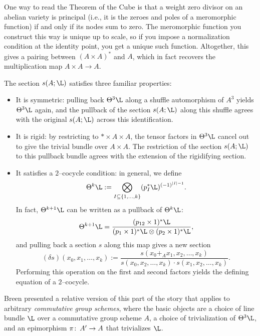 \begin{remark}
One way to read the Theorem of the Cube is that a weight zero divisor on an abelian variety is principal (i.e., it is the zeroes and poles of a meromorphic function) if and only if its nodes sum to zero.  The meromorphic function you construct this way is unique up to scale, so if you impose a normalization condition at the identity point, you get a unique such function.  Altogether, this gives a pairing between \((A \times A)^*\) and \(A\), which in fact recovers the multiplication map \(A \times A \to A\).
\end{remark}

\begin{remark}
The section \(s(A; \L)\) satisfies three familiar properties:
\begin{itemize}
\item It is symmetric: pulling back \(\Theta^3 \L\) along a shuffle automorphism of \(A^3\) yields \(\Theta^3 \L\) again, and the pullback of the section \(s(A; \L)\) along this shuffle agrees with the original \(s(A; \L)\) across this identification.
\item It is rigid: by restricting to \(* \times A \times A\), the tensor factors in \(\Theta^3 \L\) cancel out to give the trivial bundle over \(A \times A\).  The restriction of the section \(s(A; \L)\) to this pullback bundle agrees with the extension of the rigidifying section.
\item It satisfies a \(2\)--cocycle condition: in general, we define \[\Theta^k \L := \bigotimes_{I \subseteq \{1, \ldots, k\}} (p_I^* \L)^{(-1)^{|I| - 1}}.\]  In fact, \(\Theta^{k+1} \L\) can be written as a pullback of \(\Theta^k \L\): \[\Theta^{k+1} \L = \frac{(p_{12} \times 1)^* \L}{(p_1 \times 1)^* \L \otimes (p_2 \times 1)^* \L},\] and pulling back a section \(s\) along this map gives a new section \[(\delta s)(x_0, x_1, \ldots, x_k) := \frac{s(x_0 +_A x_1, x_2, \ldots, x_k)}{s(x_0, x_2, \ldots, x_k) \cdot s(x_1, x_2, \ldots, x_k)}.\]  Performing this operation on the first and second factors yields the defining equation of a \(2\)--cocycle.
\end{itemize}
\end{remark}

\begin{remark}
Breen presented a relative version of this part of the story that applies to arbitrary \emph{commutative group schemes}, where the basic objects are a choice of line bundle \(\L\) over a commutative group scheme \(A\), a choice of trivialization of \(\Theta^3 \L\), and an epimorphism \(\pi\colon\thinspace A' \to A\) that trivializes \(\L\).
\end{remark}

